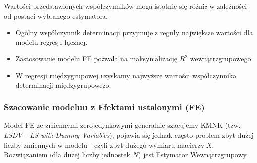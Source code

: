 Wartości przedstawionych współczynników mogą istotnie się różnić w zależności od postaci wybranego estymatora.
\begin{itemize}
\item Ogólny współczynnik determinacji przyjmuje z reguły największe wartości dla modelu regresji łącznej.
\item Zastosowanie modelu FE pozwala na maksymalizację $ R^2 $ wewnątrzgrupowego.
\item W regresji międzygrupowej uzyskamy najwyższe wartości współczynnika determinacji międzygrupowego.
\end{itemize}
\subsubsection{Szacowanie modeluu z Efektami ustalonymi (FE)}
Model FE ze zmiennymi zerojedynkowymi generalnie szacujemy KMNK (tzw. \emph{LSDV - LS with Dummy Variables}), pojawia się jednak często problem zbyt dużej liczby zmiennych w modelu - czyli zbyt dużego wymiaru macierzy $ X $. Rozwiązaniem (dla dużej liczby jednostek $ N $) jest Estymator Wewnątrzgrupowy.
